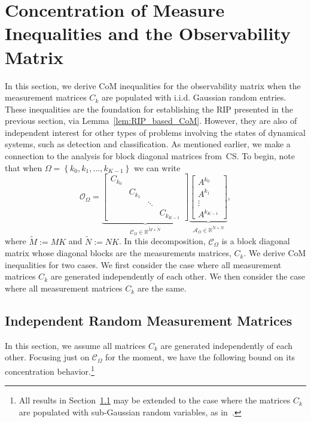 \documentclass[11pt,draftcls,onecolumn]{IEEEtran}
\def\real    { \mathbb{R} }
\def \ok {{\mathcal{O}_{\Omega}}}
\def \ck {{\mathcal{C}_{\Omega}}}
\def \ak {{\mathcal{A}_{\Omega}}}
\def \km {{\widetilde{M}}}
\def \kn {{\widetilde{N}}}
\def\real    { \mathbb{R} }
\begin{document}
\section{Concentration of Measure Inequalities and the Observability Matrix}
\label{sec:com}
In this section, we derive \ac{CoM} inequalities for the observability matrix when the measurement matrices $C_k$ are populated with \ac{i.i.d.} Gaussian random entries.
These inequalities are the foundation for establishing the \ac{RIP} presented in the previous section, via Lemma~\ref{lem:RIP_based_CoM}. However, they are also of independent interest for other types of problems involving the states of dynamical systems, such as detection and classification\cite{davenport2010signal,sanandaji2010toeplitz,sanandaji2013com}.
As mentioned earlier, we make a connection to the analysis for block diagonal matrices from~\ac{CS}.
To begin, note that when $\Omega = \left\{k_0, k_1, \dots, k_{K-1}\right\}$ we can write
\begin{equation}
\ok = \underbrace{\left[ \begin{array}{cccc} C_{k_0} &&&\\& C_{k_1} && \\ && \ddots & \\&&& C_{k_{K-1}} \end{array} \right]}_{\ck \in \real^{\km \times \kn}} \underbrace{\left[\begin{array}{c} A^{k_0} \\ A^{k_1} \\ \vdots \\ A^{k_{K-1}} \end{array} \right]}_{\ak \in \real^{\kn \times N}},
\label{eq:ckak}
\end{equation}
where $\widetilde{M} :=MK$ and $\widetilde{N} :=NK$. In this decomposition, $\ck$ is a block diagonal matrix whose diagonal blocks are the measurements matrices, $C_k$. We derive \ac{CoM} inequalities for two cases. We first consider the case where all measurement matrices $C_k$ are generated independently of each other. We then consider the case where all measurement matrices $C_k$ are the same.
\subsection{Independent Random Measurement Matrices}
\label{sec:indep}

In this section, we assume all matrices $C_k$ are generated independently of each other.
Focusing just on $\ck$ for the moment, we have the following bound on its concentration behavior.\footnote{All results in Section~\ref{sec:indep} may be extended to the case where the matrices $C_k$ are populated with sub-Gaussian random variables, as in~\cite{park2011block}.}
\end{document}
